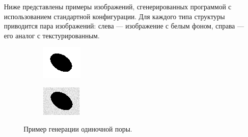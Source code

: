\documentclass[code]{wordcore}
\begin{document}
Ниже представлены примеры изображений, сгенерированных программой с использованием стандартной конфигурации. Для каждого типа структуры приводится пара изображений: слева — изображение с белым фоном, справа — его аналог с текстурированным.

\begin{figure}[H]
	\centering
	\begin{subfigure}[t]{0.48\textwidth}
		\includegraphics[width=\textwidth]{fig/signale_clean.png}
	\end{subfigure}
	\hfill %
	\begin{subfigure}[t]{0.48\textwidth}
		\includegraphics[width=\textwidth]{fig/single_noisy.png}
	\end{subfigure}
	\caption{Пример генерации одиночной поры.}
\end{figure}
\end{document}
